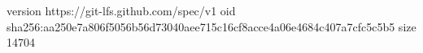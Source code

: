 version https://git-lfs.github.com/spec/v1
oid sha256:aa250e7a806f5056b56d73040aee715c16cf8acce4a06e4684c407a7cfc5c5b5
size 14704

